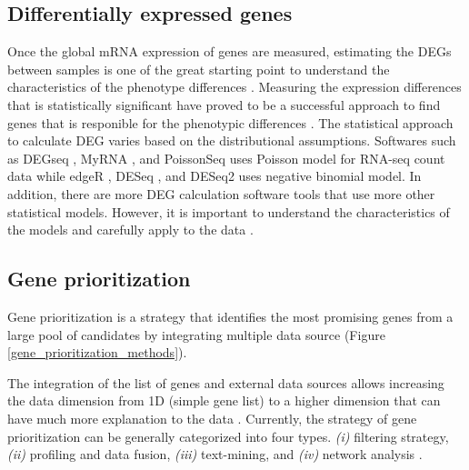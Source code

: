\documentclass[oneside,phd]{snuthesis}
\begin{document}
\subsection{Differentially expressed genes}

Once the global mRNA expression of genes are measured, estimating the DEGs between samples is one of the great starting point to understand the characteristics of the phenotype differences \citep{marioni2008rna}. 
Measuring the expression differences that is statistically significant have proved to be a successful approach to find genes that is responible for the phenotypic differences \citep{hardcastle2010bayseq, robinson2010edger, anders2012differential, trapnell2013differential,leng2013ebseq,li2013finding,tarazona2015data}.
The statistical approach to calculate DEG varies based on the distributional assumptions. Softwares such as DEGseq \citep{wang2009degseq}, MyRNA \citep{langmead2010cloud}, and PoissonSeq \citep{li2012normalization} uses Poisson model for RNA-seq count data while edgeR \citep{robinson2010edger}, DESeq \citep{anders2012differential}, and DESeq2 \citep{love2014moderated} uses negative binomial model. 
In addition, there are more DEG calculation software tools that use more other statistical models. However, it is important to understand the characteristics of the models and carefully apply to the data \citep{huang2015differential}.

\subsection{Gene prioritization}
Gene prioritization is a strategy that identifies the most promising genes from a large pool of candidates by integrating multiple data source (Figure \ref{gene_prioritization_methods}). 

The integration of the list of genes and external data sources allows increasing the data dimension from 1D (simple gene list) to a higher dimension that can have much more explanation to the data \citep{moreau2012computational, cowen2017network}.
Currently, the strategy of gene prioritization can be generally categorized into four types.
\textit{(i)} filtering strategy, \textit{(ii)} profiling and data fusion, \textit{(iii)} text-mining, and \textit{(iv)} network analysis \citep{moreau2012computational}. 
\end{document}
